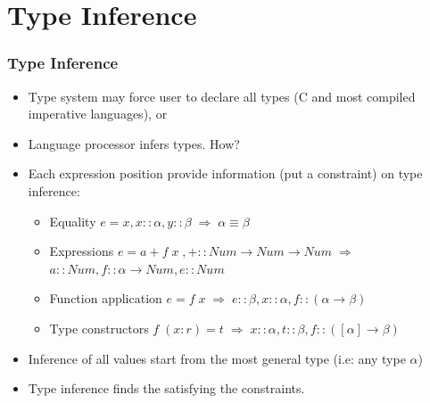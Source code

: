 \section{Type Inference}
\begin{frame}
\frametitle{Type Inference}
\begin{itemize}
\item Type system may force user to declare all types (C and most compiled imperative
languages), or
\item Language processor infers types. How?
\item Each expression position provide information (put a constraint)
on type inference:
\begin{itemize}
\item Equality $e=x, x::\alpha, y::\beta \;\Rightarrow\; \alpha\equiv\beta$
\item Expressions $e=a+f\;x \;,
+::Num \rightarrow Num \rightarrow Num 
\;\Rightarrow\;$ \\
$a::Num, 
f::\alpha \rightarrow Num,
e::Num$
\item Function application $e=f\;x \;\Rightarrow \; e::\beta, x::\alpha,
f::(\alpha \rightarrow \beta)$ 
\item Type constructors $f\;(x:r) = t \;\Rightarrow \; x::\alpha, t::\beta,
f::([\alpha] \rightarrow \beta)$
\end{itemize}
\item Inference of all values start from the most general type (i.e: any type
$\alpha$)
\item Type inference finds the  satisfying the
constraints.
\end{itemize}
\end{frame}

